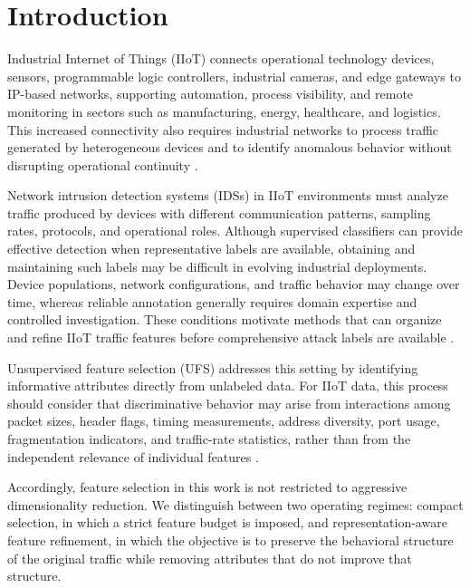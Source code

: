 \section{Introduction}
\label{sec:introduction}
 Industrial Internet of Things (IIoT) connects operational technology devices, sensors, programmable logic controllers, industrial cameras, and edge gateways to IP-based networks, supporting automation, process visibility, and remote monitoring in sectors such as manufacturing, energy, healthcare, and logistics. This increased connectivity also requires industrial networks to process traffic generated by heterogeneous devices and to identify anomalous behavior without disrupting operational continuity \cite{firouzi2025datasense,esmaeilyfard2026gelax}.

Network intrusion detection systems (IDSs) in IIoT environments must analyze traffic produced by devices with different communication patterns, sampling rates, protocols, and operational roles. Although supervised classifiers can provide effective detection when representative labels are available, obtaining and maintaining such labels may be difficult in evolving industrial deployments. Device populations, network configurations, and traffic behavior may change over time, whereas reliable annotation generally requires domain expertise and controlled investigation. These conditions motivate methods that can organize and refine IIoT traffic features before comprehensive attack labels are available \cite{andresini2021insomnia,alrumaih2026lightweight}.

Unsupervised feature selection (UFS) addresses this setting by identifying informative attributes directly from unlabeled data. For IIoT data, this process should consider that discriminative behavior may arise from interactions among packet sizes, header flags, timing measurements, address diversity, port usage, fragmentation indicators, and traffic-rate statistics, rather than from the independent relevance of individual features \cite{solorio2020review}.

Accordingly, feature selection in this work is not restricted to aggressive dimensionality reduction. We distinguish between two operating regimes: compact selection, in which a strict feature budget is imposed, and representation-aware feature refinement, in which the objective is to preserve the behavioral structure of the original traffic while removing attributes that do not improve that structure. 

